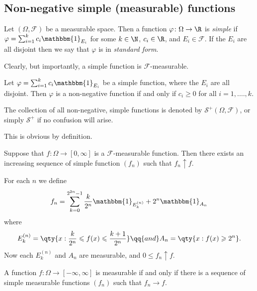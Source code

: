 \documentclass{maths}
\newcommand{\alg}{\mathcal{F}}
\newcommand{\smpl}{\mathcal{S}}
\newcommand{\ind}{\mathbbm{1}}
\begin{document}
\subsection{Non-negative simple (measurable) functions}

\begin{defn}
    Let $(\Omega,\alg)$ be a measurable space.
    Then a function $\varphi\colon\Omega\to\R$ is \emph{simple} if $\varphi = \sum_{i=1}^k c_i \ind_{E_i}$ for some $k\in\N$, $c_i\in\R$, and $E_i\in\alg$.
    If the $E_i$ are all disjoint then we say that $\varphi$ is in \emph{standard form}.

    Clearly, but importantly, a simple function is $\alg$-measurable.
\end{defn}

\begin{lem}
    Let $\varphi=\sum_{i=1}^k c_i \ind_{E_i}$ be a simple function, where the $E_i$ are all disjoint.
    Then $\varphi$ is a non-negative function if and only if $c_i\geqslant0$ for all $i=1,.\ldots,k$.

    The collection of all non-negative, simple functions is denoted by $\smpl^+(\Omega,\alg)$, or simply $\smpl^+$ if no confusion will arise.
\end{lem}

\begin{prf}
    This is obvious by definition.
\end{prf}

\begin{thm}
    Suppose that $f\colon\Omega\to[0,\infty]$ is a $\alg$-measurable function.
    Then there exists an increasing sequence of simple function $(f_n)$ such that $f_n\uparrow f$.
\end{thm}

\begin{prf}
    For each $n$ we define
    \[
        f_n =
        \sum_{k=0}^{2^{2n}-1} \frac{k}{2^n} \ind_{E_k^{(n)}} + 2^n\ind_{A_n}
    \]
    where
    \[
        E_k^{(n)} =
        \qty{x : \frac{k}{2^n}\leqslant f(x)\leqslant\frac{k+1}{2^n}}
        \qq{and}
        A_n =
        \qty{x : f(x)\geqslant 2^n}.
    \]
    Now each $E_k^{(n)}$ and $A_n$ are measurable, and $0\leqslant f_n\uparrow f$.
\end{prf}

\begin{cor}
    A function $f\colon\Omega\to[-\infty,\infty]$ is measurable if and only if there is a sequence of simple measurable functions $(f_n)$ such that $f_n\to f$.
\end{cor}
\end{document}
